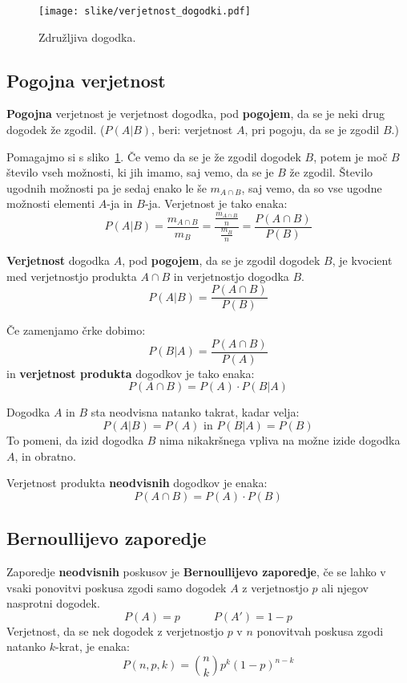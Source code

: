 \documentclass[a4paper,oneside,12pt,fleqn]{article}
\newcommand\krat\cdot
\newcommand{\beforecaptionskip}{\vspace{-12pt}}
\numberwithin{equation}{section}
\begin{document}
\begin{figure}[h]
  \begin{center}
    \texttt{[image: slike/verjetnost\_dogodki.pdf]}
  \end{center}
  \beforecaptionskip
  \caption{Združljiva dogodka.}
  \label{fig:verj:zdruz}
\end{figure}

\subsection{Pogojna verjetnost}
\label{sec:verj:pog}

\textbf{Pogojna} verjetnost je verjetnost dogodka, pod \textbf{pogojem}, da se je neki drug dogodek že
zgodil. ($P(A|B)$, beri: verjetnost $A$, pri pogoju, da se je zgodil $B$.)

Pomagajmo si s sliko~\ref{fig:verj:zdruz}.
Če vemo da se je že zgodil dogodek $B$, potem je moč $B$ število vseh možnosti, ki jih
imamo, saj vemo, da se je $B$ že zgodil.
Število ugodnih možnosti pa je sedaj enako le še $m_{A\cap B}$, saj vemo, da so vse ugodne
možnosti elementi $A$-ja in $B$-ja. Verjetnost je tako enaka:
\[ P(A|B) = \frac{m_{A\cap B}}{m_B} = \frac{\frac{m_{A\cap B}}{n}}{\frac{m_B}{n}} =
\frac{P(A\cap B)}{P(B)} \]

\textbf{Verjetnost} dogodka $A$, pod \textbf{pogojem}, da se je zgodil dogodek $B$, je kvocient med
verjetnostjo produkta $A \cap B$ in verjetnostjo dogodka $B$.
\[ P(A|B) = \frac{P(A\cap B)}{P(B)} \]

Če zamenjamo črke dobimo:
\[ P(B|A) = \frac{P(A\cap B)}{P(A)} \]
in \textbf{verjetnost produkta} dogodkov je tako enaka:
\[ P(A\cap B) = P(A) \krat P(B|A) \]

Dogodka $A$ in $B$ sta neodvisna natanko takrat, kadar velja:
\[ P(A|B) = P(A) \text{ in } P(B|A) = P(B) \]
To pomeni, da izid dogodka $B$ nima nikakršnega vpliva na možne izide dogodka $A$, in
obratno.

Verjetnost produkta \textbf{neodvisnih} dogodkov je enaka:
\[ P(A \cap B) = P(A)\krat P(B) \]

\subsection{Bernoullijevo zaporedje}
\label{sec:ver:bern}

Zaporedje \textbf{neodvisnih} poskusov je \textbf{Bernoullijevo zaporedje}, če se lahko v vsaki ponovitvi
poskusa zgodi samo dogodek $A$ z verjetnostjo $p$ ali njegov nasprotni dogodek.
\[ P(A) = p \qquad \quad P(A') = 1-p \]
Verjetnost, da se nek dogodek z verjetnostjo $p$ v $n$ ponovitvah poskusa zgodi natanko
$k$-krat, je enaka:
\[ P(n, p, k) = \binom{n}{k}p^k(1-p)^{n-k} \]
\end{document}
